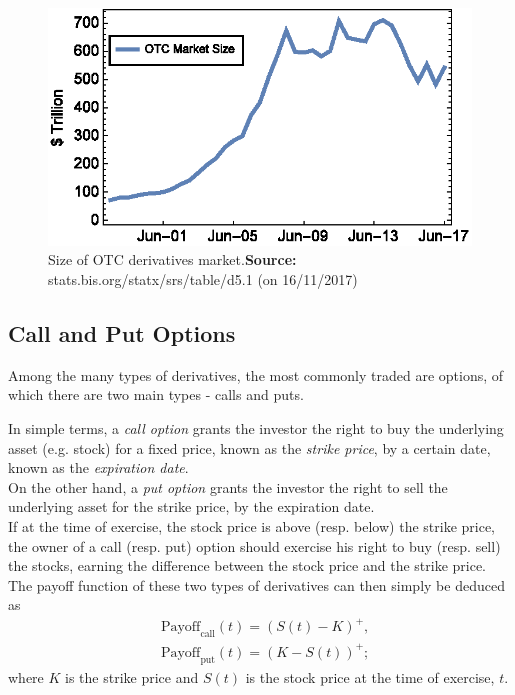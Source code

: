 \documentclass[a4paper,prd,twocolumn,nofootinbib,superscriptaddress,floatfix]{revtex4}
\begin{document}
\begin{figure}[H]
    \centering
      \includegraphics[width=.9\columnwidth,trim={2pt 17pt 0 0},clip]{OTC.eps}
      \caption{Size of OTC derivatives market.\newline \footnotesize{\textbf{Source:} stats.bis.org/statx/srs/table/d5.1 (on 16/11/2017)}}\label{fig:OTC}
    \end{figure}

\subsection{Call and Put Options}
Among the many types of derivatives, the most commonly traded are options, of which there are two main types - calls and puts.

In simple terms, a \textit{call option} grants the investor the right to buy the underlying asset (e.g. stock) for a fixed price, known as the \textit{strike price}, by a certain date, known as the \textit{expiration date}.\\
On the other hand, a \textit{put option} grants the investor the right to sell the underlying asset for the strike price, by the expiration date.\\
If at the time of exercise, the stock price is above (resp. below) the strike price, the owner of a call (resp. put) option should exercise his right to buy (resp. sell) the stocks, earning the difference between the stock price and the strike price. The payoff function of these two types of derivatives can then simply be deduced as
\begin{equation}\label{callput}
\begin{split}
&\text{Payoff}_\text{call}(t)=(S(t)-K)^+,\\
&\text{Payoff}_\text{put}(t)=(K-S(t))^+;
\end{split}
\end{equation}
\noindent where $K$ is the strike price and $S(t)$ is the stock price at the time of exercise, $t$.
\end{document}
